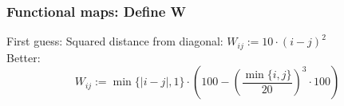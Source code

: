 \documentclass[compress]{beamer}
\begin{document}
\begin{frame}[fragile]
\frametitle{Functional maps: Define W}
First guess: Squared distance from diagonal: $W_{ij}:=10 \cdot (i-j)^2$\\
Better:
$$
	W_{ij} :=\min\{|i - j|, 1\} \cdot (100 - \left(\frac{\min\{i, j\}}{20}\right)^3 \cdot 100)
$$
\begin{figure}[htp]
  \begin{center}

\end{center}
\end{figure}
\end{frame}
\end{document}
